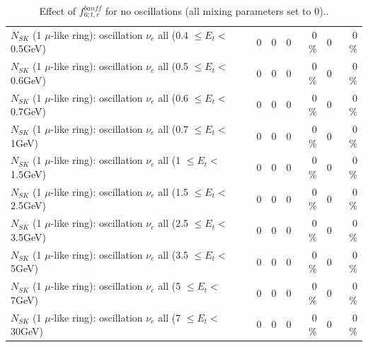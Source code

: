 \begin{table}
\begin{tabular}{| l | r | r | r  r | r  r |}
$N_{SK}$ (1 $\mu$-like ring): oscillation $\nu_{e}$ all (0.4 $\leq E_{t} <$ 0.5GeV) &               0 &               0 &               0 &        0 \%  &               0 &        0 \%  \\ 
$N_{SK}$ (1 $\mu$-like ring): oscillation $\nu_{e}$ all (0.5 $\leq E_{t} <$ 0.6GeV) &               0 &               0 &               0 &        0 \%  &               0 &        0 \%  \\ 
$N_{SK}$ (1 $\mu$-like ring): oscillation $\nu_{e}$ all (0.6 $\leq E_{t} <$ 0.7GeV) &               0 &               0 &               0 &        0 \%  &               0 &        0 \%  \\ 
$N_{SK}$ (1 $\mu$-like ring): oscillation $\nu_{e}$ all (0.7 $\leq E_{t} <$ 1GeV) &               0 &               0 &               0 &        0 \%  &               0 &        0 \%  \\ 
$N_{SK}$ (1 $\mu$-like ring): oscillation $\nu_{e}$ all (1 $\leq E_{t} <$ 1.5GeV) &               0 &               0 &               0 &        0 \%  &               0 &        0 \%  \\ 
$N_{SK}$ (1 $\mu$-like ring): oscillation $\nu_{e}$ all (1.5 $\leq E_{t} <$ 2.5GeV) &               0 &               0 &               0 &        0 \%  &               0 &        0 \%  \\ 
$N_{SK}$ (1 $\mu$-like ring): oscillation $\nu_{e}$ all (2.5 $\leq E_{t} <$ 3.5GeV) &               0 &               0 &               0 &        0 \%  &               0 &        0 \%  \\ 
$N_{SK}$ (1 $\mu$-like ring): oscillation $\nu_{e}$ all (3.5 $\leq E_{t} <$ 5GeV) &               0 &               0 &               0 &        0 \%  &               0 &        0 \%  \\ 
 $N_{SK}$ (1 $\mu$-like ring): oscillation $\nu_{e}$ all (5 $\leq E_{t} <$ 7GeV) &               0 &               0 &               0 &        0 \%  &               0 &        0 \%  \\ 
$N_{SK}$ (1 $\mu$-like ring): oscillation $\nu_{e}$ all (7 $\leq E_{t} <$ 30GeV) &               0 &               0 &               0 &        0 \%  &               0 &        0 \%  \\ 
\hline
\hline
\end{tabular}
\caption{ Effect of $f_{6; t, r}^{banff}$ for no oscillations (all mixing parameters set to 0).. }
\label{tab:num_banff_06_1RmuT_3f_osc_t13:0}
\end{table}
\clearpage
